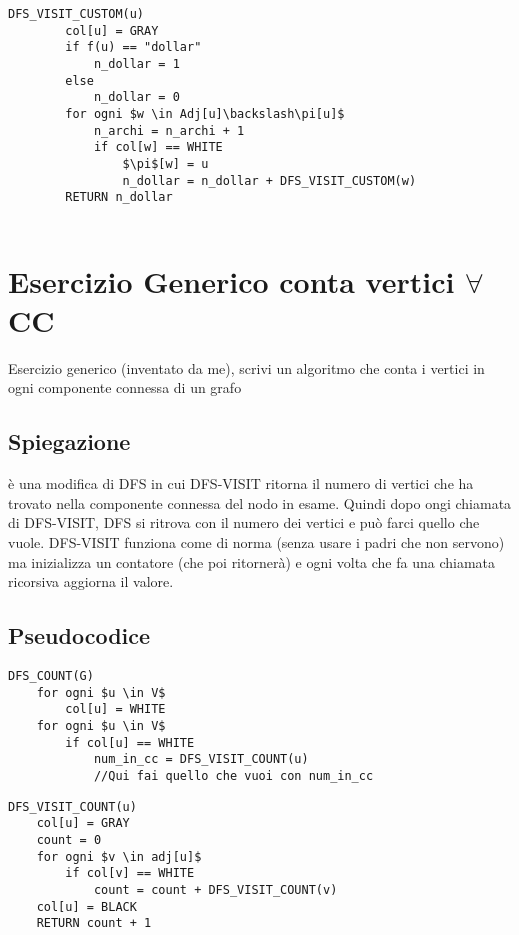 \documentclass[12pt, a4paper, openany]{book}
\begin{document}
    \begin{lstlisting}[mathescape=true]
    DFS_VISIT_CUSTOM(u)
        col[u] = GRAY
        if f(u) == "dollar"
            n_dollar = 1
        else
            n_dollar = 0
        for ogni $w \in Adj[u]\backslash\pi[u]$
            n_archi = n_archi + 1
            if col[w] == WHITE
                $\pi$[w] = u
                n_dollar = n_dollar + DFS_VISIT_CUSTOM(w)
        RETURN n_dollar


    \end{lstlisting}

    \section{Esercizio Generico conta vertici $\forall$ CC}
    Esercizio generico (inventato da me), scrivi un algoritmo che conta i vertici in ogni componente connessa di un grafo

    \subsection*{Spiegazione}
    è una modifica di DFS in cui DFS-VISIT ritorna il numero di vertici che ha trovato nella componente connessa
    del nodo in esame. Quindi dopo ongi chiamata di DFS-VISIT, DFS si ritrova con il numero dei vertici e può farci quello che vuole.
    DFS-VISIT funziona come di norma (senza usare i padri che non servono) ma inizializza un contatore (che poi ritornerà) e ogni volta
    che fa una chiamata ricorsiva aggiorna il valore.

    \subsection*{Pseudocodice}

    \begin{lstlisting}[mathescape=true]
DFS_COUNT(G)
    for ogni $u \in V$
        col[u] = WHITE
    for ogni $u \in V$
        if col[u] == WHITE
            num_in_cc = DFS_VISIT_COUNT(u)
            //Qui fai quello che vuoi con num_in_cc 
\end{lstlisting}

    \begin{lstlisting}[mathescape=true]
DFS_VISIT_COUNT(u)
    col[u] = GRAY
    count = 0
    for ogni $v \in adj[u]$
        if col[v] == WHITE
            count = count + DFS_VISIT_COUNT(v)
    col[u] = BLACK
    RETURN count + 1
\end{lstlisting}
\end{document}
